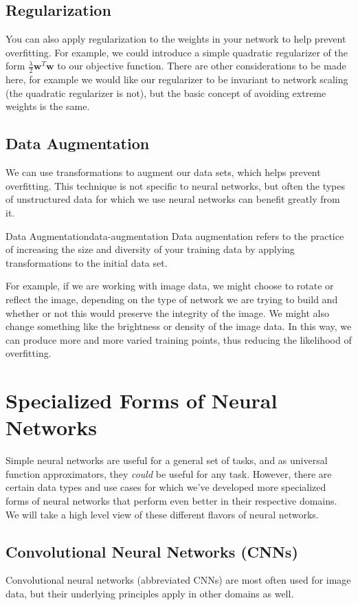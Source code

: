 \subsection{Regularization}
You can also apply regularization to the weights in your network to help prevent overfitting. For example, we could introduce a simple quadratic regularizer of the form $\frac{\lambda}{2} \textbf{w}^{T}\textbf{w}$ to our objective function. There are other considerations to be made here, for example we would like our regularizer to be invariant to network scaling (the quadratic regularizer is not), but the basic concept of avoiding extreme weights is the same.

\subsection{Data Augmentation}
We can use transformations to augment our data sets, which helps prevent overfitting. This technique is not specific to neural networks, but often the types of unstructured data for which we use neural networks can benefit greatly from it.
\begin{definition}{Data Augmentation}{data-augmentation}
Data augmentation refers to the practice of increasing the size and diversity of your training data by applying transformations to the initial data set.
\end{definition}
For example, if we are working with image data, we might choose to rotate or reflect the image, depending on the type of network we are trying to build and whether or not this would preserve the integrity of the image. We might also change something like the brightness or density of the image data. In this way, we can produce more and more varied training points, thus reducing the likelihood of overfitting.

\section{Specialized Forms of Neural Networks}
Simple neural networks are useful for a general set of tasks, and as universal function approximators, they \textit{could} be useful for any task. However, there are certain data types and use cases for which we've developed more specialized forms of neural networks that perform even better in their respective domains. We will take a high level view of these different flavors of neural networks.

\subsection{Convolutional Neural Networks (CNNs)}
Convolutional neural networks (abbreviated CNNs) are most often used for image data, but their underlying principles apply in other domains as well.

